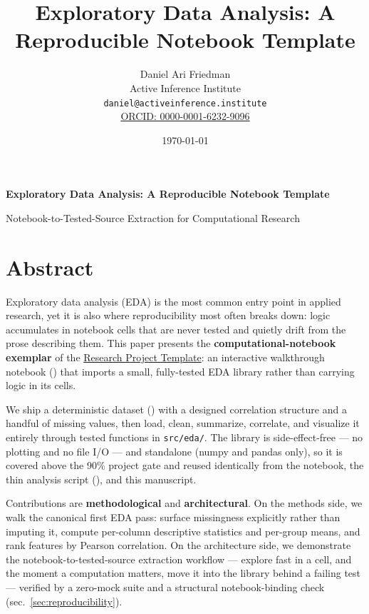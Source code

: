 \documentclass[
]{article}
\author{}
\date{}
\title{Exploratory Data Analysis: A Reproducible Notebook Template}
\author{Daniel Ari Friedman\\\footnotesize{Active Inference Institute}\\\footnotesize{\texttt{daniel@activeinference.institute}}\\\footnotesize{\href{https://orcid.org/0000-0001-6232-9096}{ORCID: 0000-0001-6232-9096}}}
\date{\today}
\begin{document}
\begin{titlepage}
\centering
\vspace*{2cm}
{\LARGE\bfseries Exploratory Data Analysis: A Reproducible Notebook Template\par}
\vspace{0.75em}
{\large Notebook-to-Tested-Source Extraction for Computational Research\par}
\vfill
\makeatletter
{\@author\par}
\vspace{1em}
{\@date\par}
\makeatother
\vfill
\end{titlepage}
\thispagestyle{empty}
\tableofcontents
\newpage


\section{Abstract}\label{sec:abstract}

Exploratory data analysis (EDA) is the most common entry point in
applied research, yet it is also where reproducibility most often breaks
down: logic accumulates in notebook cells that are never tested and
quietly drift from the prose describing them. This paper presents the
\textbf{computational-notebook exemplar} of the
\href{https://github.com/docxology/template}{Research Project Template}:
an interactive walkthrough notebook
()
that imports a small, fully-tested EDA library rather than carrying
logic in its cells.

We ship a deterministic dataset () with a
designed correlation structure and a handful of missing values, then
load, clean, summarize, correlate, and visualize it entirely through
tested functions in \texttt{src/eda/}. The library is side-effect-free
--- no plotting and no file I/O --- and standalone (numpy and pandas
only), so it is covered above the 90\% project gate and reused
identically from the notebook, the thin analysis script
(), and this manuscript.

Contributions are \textbf{methodological} and \textbf{architectural}. On
the methods side, we walk the canonical first EDA pass: surface
missingness explicitly rather than imputing it, compute per-column
descriptive statistics and per-group means, and rank features by Pearson
correlation. On the architecture side, we demonstrate the
notebook-to-tested-source extraction workflow --- explore fast in a
cell, and the moment a computation matters, move it into the library
behind a failing test --- verified by a zero-mock suite and a structural
notebook-binding check (sec.~\ref{sec:reproducibility}).
\end{document}

